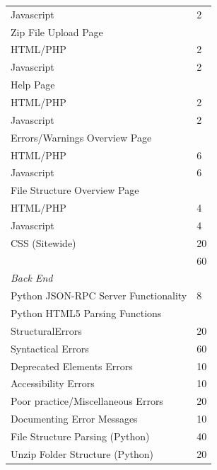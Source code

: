 \documentclass[12pt]{article}
\begin{document}
\begin{longtable}{|l|l|}
    Javascript                           & 2             \\
    Zip File Upload Page                 & ~             \\
    HTML/PHP                             & 2             \\
    Javascript                           & 2             \\
    Help Page                            & ~             \\
    HTML/PHP                             & 2             \\
    Javascript                           & 2             \\
    Errors/Warnings Overview Page        & ~             \\
    HTML/PHP                             & 6             \\
    Javascript                           & 6             \\
    File Structure Overview Page         & ~             \\
    HTML/PHP                             & 4             \\
    Javascript                           & 4             \\
    CSS (Sitewide)                       & 20            \\
    \hline
    ~                                    & 60            \\
    \hline
    {\em Back End}                       & ~             \\
    Python JSON-RPC Server Functionality & 8             \\
    Python HTML5 Parsing Functions       & ~             \\
    StructuralErrors                     & 20            \\
    Syntactical Errors                   & 60            \\
    Deprecated Elements Errors           & 10            \\
    Accessibility Errors                 & 10            \\
    Poor practice/Miscellaneous Errors   & 20            \\
    Documenting Error Messages           & 10            \\
    File Structure Parsing (Python)      & 40            \\
    Unzip Folder Structure (Python)      & 20            \\

\end{longtable}
\end{document}
